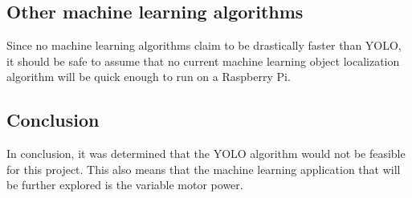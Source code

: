 \subsection{Other machine learning algorithms}
Since no machine learning algorithms claim to be drastically faster than YOLO, it should be safe to assume that no current machine learning object localization algorithm will be quick enough to run on a Raspberry Pi.


\subsection{Conclusion}
In conclusion, it was determined that the YOLO algorithm would not be feasible for this project.
This also means that the machine learning application that will be further explored is the variable motor power.